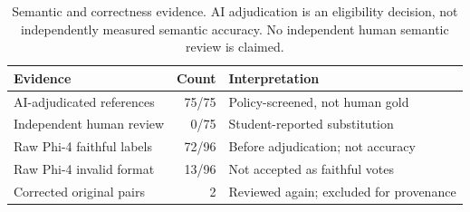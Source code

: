 \begin{table}[t]
\centering
\caption{Semantic and correctness evidence. AI adjudication is an eligibility decision, not independently measured semantic accuracy. No independent human semantic review is claimed.}
\label{tab:semantic}
\small
\begin{tabular}{lrl}
\toprule
Evidence & Count & Interpretation \\
\midrule
AI-adjudicated references & 75/75 & Policy-screened, not human gold \\
Independent human review & 0/75 & Student-reported substitution \\
Raw Phi-4 faithful labels & 72/96 & Before adjudication; not accuracy \\
Raw Phi-4 invalid format & 13/96 & Not accepted as faithful votes \\
Corrected original pairs & 2 & Reviewed again; excluded for provenance \\
\bottomrule
\end{tabular}
\end{table}
